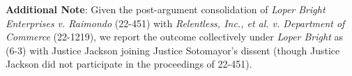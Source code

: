 \noindent \textbf{Additional Note}: Given the post-argument consolidation of \emph{Loper Bright Enterprises v. Raimondo} (22-451) with \emph{Relentless, Inc., et al. v. Department of Commerce} (22-1219), we report the outcome collectively under \emph{Loper Bright} as (6-3) with Justice Jackson joining Justice Sotomayor's dissent (though Justice Jackson did not participate in the proceedings of 22-451).


